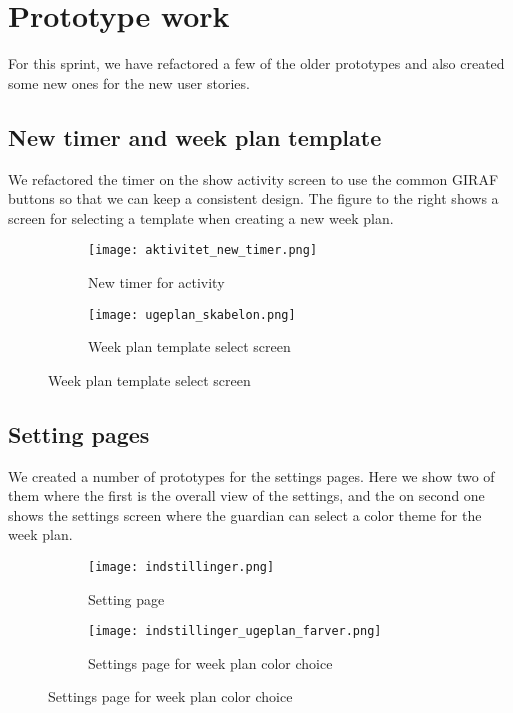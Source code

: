 \section{Prototype work}
For this sprint, we have refactored a few of the older prototypes and also created some new ones for the new user stories.

\subsection{New timer and week plan template}
We refactored the timer on the show activity screen to use the common GIRAF buttons so that we can keep a consistent design. The figure to the right shows a screen for selecting a template when creating a new week plan.
\begin{figure}[H]
    \begin{subfigure}{0.5\textwidth}
    \texttt{[image: aktivitet\_new\_timer.png]}
    \caption{New timer for activity}
    \label{fig:activity_new_timer}
    \end{subfigure}
    \begin{subfigure}{0.5\textwidth}
        \texttt{[image: ugeplan\_skabelon.png]}
    \caption{Week plan template select screen}
    \label{fig:weekplan_template_screen}
    \end{subfigure} 
\end{figure}

\subsection{Setting pages}
We created a number of prototypes for the settings pages. Here we show two of them where the first is the overall view of the settings, and the on second one shows the settings screen where the guardian can select a color theme for the week plan.
\begin{figure}[H]
    \begin{subfigure}{0.5\textwidth}
    \texttt{[image: indstillinger.png]} 
    \caption{Setting page}
    \label{fig:settings}
    \end{subfigure}
    \begin{subfigure}{0.5\textwidth}
        \texttt{[image: indstillinger\_ugeplan\_farver.png]}
    \caption{Settings page for week plan color choice}
    \label{fig:settings_color_choice}
    \end{subfigure} 
\end{figure}

